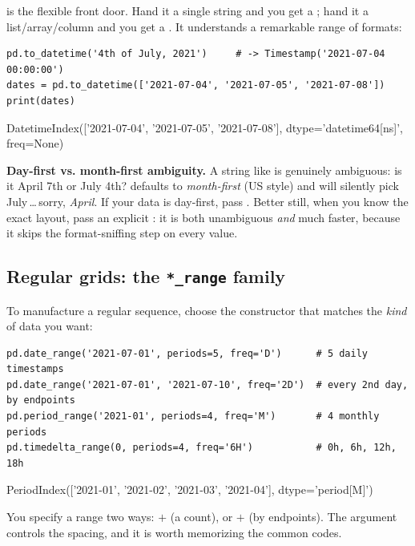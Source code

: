 \documentclass[11pt]{article}
\begin{document}
 is the flexible front door. Hand it a single string and you get a ; hand it a list/array/column and you get a . It understands a remarkable range of formats:

\begin{lstlisting}
pd.to_datetime('4th of July, 2021')     # -> Timestamp('2021-07-04 00:00:00')
dates = pd.to_datetime(['2021-07-04', '2021-07-05', '2021-07-08'])
print(dates)
\end{lstlisting}

\begin{outblock}
DatetimeIndex(['2021-07-04', '2021-07-05', '2021-07-08'],
              dtype='datetime64[ns]', freq=None)
\end{outblock}

\begin{pitfall}
\textbf{Day-first vs. month-first ambiguity.} A string like  is genuinely ambiguous: is it April 7th or July 4th?  defaults to \emph{month-first} (US style) and will silently pick July\,\dots\,sorry, \emph{April}. If your data is day-first, pass . Better still, when you know the exact layout, pass an explicit : it is both unambiguous \emph{and} much faster, because it skips the format-sniffing step on every value.
\end{pitfall}

\subsection{Regular grids: the \texttt{*\_range} family}

To manufacture a regular sequence, choose the constructor that matches the \emph{kind} of data you want:

\begin{lstlisting}
pd.date_range('2021-07-01', periods=5, freq='D')      # 5 daily timestamps
pd.date_range('2021-07-01', '2021-07-10', freq='2D')  # every 2nd day, by endpoints
pd.period_range('2021-01', periods=4, freq='M')       # 4 monthly periods
pd.timedelta_range(0, periods=4, freq='6H')           # 0h, 6h, 12h, 18h
\end{lstlisting}

\begin{outblock}
PeriodIndex(['2021-01', '2021-02', '2021-03', '2021-04'],
            dtype='period[M]')
\end{outblock}

You specify a range two ways:  $+$  (a count), or  $+$  (by endpoints). The  argument controls the spacing, and it is worth memorizing the common codes.
\end{document}
